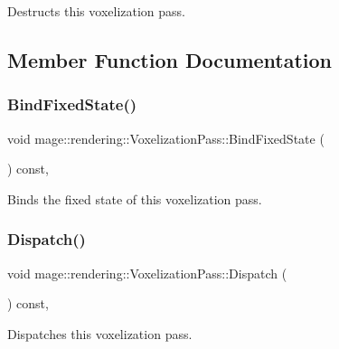Destructs this voxelization pass. 

\subsection{Member Function Documentation}
\hypertarget{classmage_1_1rendering_1_1_voxelization_pass_ae69d6465ab918f12940339436fe56c56}{}\label{classmage_1_1rendering_1_1_voxelization_pass_ae69d6465ab918f12940339436fe56c56} 
\subsubsection{\texorpdfstring{Bind\+Fixed\+State()}{BindFixedState()}}
{\footnotesize\ttfamily void mage\+::rendering\+::\+Voxelization\+Pass\+::\+Bind\+Fixed\+State (\begin{DoxyParamCaption}{ }\end{DoxyParamCaption}) const\hspace{0.3cm}{\ttfamily [private]}, {\ttfamily [noexcept]}}

Binds the fixed state of this voxelization pass. \hypertarget{classmage_1_1rendering_1_1_voxelization_pass_a5026abcbe3aad3627e96ee055df8b842}{}\label{classmage_1_1rendering_1_1_voxelization_pass_a5026abcbe3aad3627e96ee055df8b842} 
\subsubsection{\texorpdfstring{Dispatch()}{Dispatch()}}
{\footnotesize\ttfamily void mage\+::rendering\+::\+Voxelization\+Pass\+::\+Dispatch (\begin{DoxyParamCaption}{ }\end{DoxyParamCaption}) const\hspace{0.3cm}{\ttfamily [private]}, {\ttfamily [noexcept]}}

Dispatches this voxelization pass. \hypertarget{classmage_1_1rendering_1_1_voxelization_pass_a30bf15dac8660764cd1342a4f397e47e}{}\label{classmage_1_1rendering_1_1_voxelization_pass_a30bf15dac8660764cd1342a4f397e47e} 
